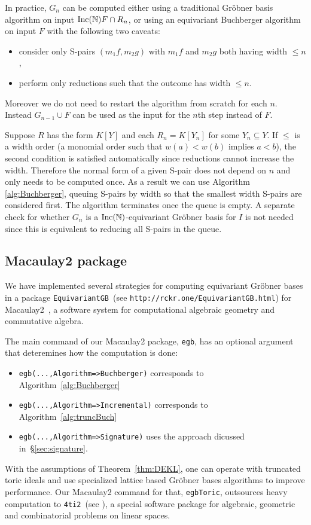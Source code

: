 In practice, $G_n$ can be computed either using a traditional Gr\"obner basis algorithm on input $\operatorname{Inc}(\mathbb N) F \cap R_n$, or using an equivariant Buchberger algorithm on input $F$ with the following two caveats:
\begin{itemize}
 \item consider only S-pairs $(m_1f, m_2g)$ with $m_1f$ and $m_2g$ both having width $\leq n$,
 \item perform only reductions such that the outcome has width $\leq n$.
\end{itemize}
Moreover we do not need to restart the algorithm from scratch for each $n$.  Instead $G_{n-1} \cup F$ can be used as the input for the $n$th step instead of $F$.

Suppose $R$ has the form $K[Y]$ and each $R_n = K[Y_n]$ for some $Y_n \subseteq Y$.  If $\leq$ is a width order (a monomial order such that $w(a) < w(b)$ implies $a < b$), the second condition is satisfied automatically since reductions cannot increase the width.  Therefore the normal form of a given S-pair does not depend on $n$ and only needs to be computed once.  As a result we can use Algorithm \ref{alg:Buchberger}, queuing S-pairs by width so that the smallest width S-pairs are considered first.  The algorithm terminates once the queue is empty.  A separate check for whether $G_n$ is a $\operatorname{Inc}(\mathbb N)$-equivariant Gr\"obner basis for $I$ is not needed since this is equivalent to reducing all S-pairs in the queue.

\subsection{Macaulay2 package}

We have implemented several strategies for computing equivariant Gr\"obner bases in a package \verb|EquivariantGB|~(see {\tt http://rckr.one/EquivariantGB.html}) for Macaulay2~\cite{grayson2002macaulay}, a software system for computational algebraic geometry and commutative algebra.

The main command of our Macaulay2 package, \verb|egb|, has an optional argument that deteremines how the computation is done:
\begin{itemize}
\item 
\verb|egb(...,Algorithm=>Buchberger)| corresponds to Algorithm~\ref{alg:Buchberger}
\item 
\verb|egb(...,Algorithm=>Incremental)| corresponds to Algorithm~\ref{alg:truncBuch}
\item 
\verb|egb(...,Algorithm=>Signature)| uses the approach dicussed in~\S\ref{sec:signature}.
\end{itemize}

With the assumptions of Theorem~\ref{thm:DEKL}, one can operate  with truncated toric ideals and use specialized lattice based Gr\"obner bases algorithms to improve performance. Our Macaulay2 command for that, \verb|egbToric|, outsources heavy computation to \verb|4ti2|~(see \cite{4ti2}),  a special software package for algebraic, geometric and combinatorial problems on linear spaces.   
